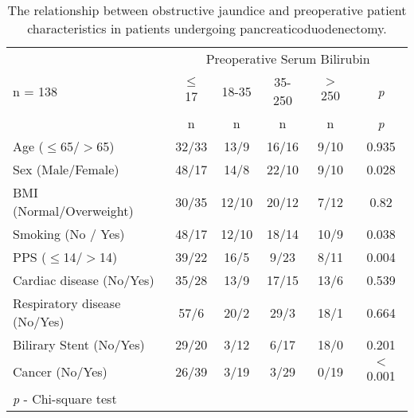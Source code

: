 \begin{sidewaystable}[p]

\caption{The relationship  between obstructive jaundice and preoperative patient characteristics in patients undergoing pancreaticoduodenectomy.}
\label{table:cpet_oj_patient}
\centering\renewcommand{\arraystretch}{1.4} %
\setlength{\tabcolsep}{12pt} %
	\begin{tabular}{| l | c c c c c |}
		\hline
		                             & \multicolumn{5}{c|}{Preoperative Serum Bilirubin} \\
		n = 138                      & $\leq$ 17 & 18-35 & 35-250 & $>$ 250 & \textit{p} \\
		                             & n         & n     & n      & n       & \textit{p} \\ \hline
		Age ($\leq$65/$>$65)         & 32/33     & 13/9  & 16/16  & 9/10    & 0.935      \\
		Sex (Male/Female)            & 48/17     & 14/8  & 22/10  & 9/10    & 0.028      \\
		BMI (Normal/Overweight)      & 30/35     & 12/10 & 20/12  & 7/12    & 0.82       \\
		Smoking (No / Yes)           & 48/17     & 12/10 & 18/14  & 10/9    & 0.038      \\
		PPS ($\leq$14/$>$14)         & 39/22     & 16/5  & 9/23   & 8/11    & 0.004      \\
		Cardiac disease (No/Yes)     & 35/28     & 13/9  & 17/15  & 13/6    & 0.539      \\
		Respiratory disease (No/Yes) & 57/6      & 20/2  & 29/3   & 18/1    & 0.664      \\
		Bilirary Stent (No/Yes)      & 29/20     & 3/12  & 6/17   & 18/0    & 0.201      \\
		Cancer (No/Yes)              & 26/39     & 3/19  & 3/29   & 0/19    & $<$0.001   \\ \hline
		\multicolumn{6}{l}{\textit{p} - Chi-square test}
	\end{tabular}
\end{sidewaystable}